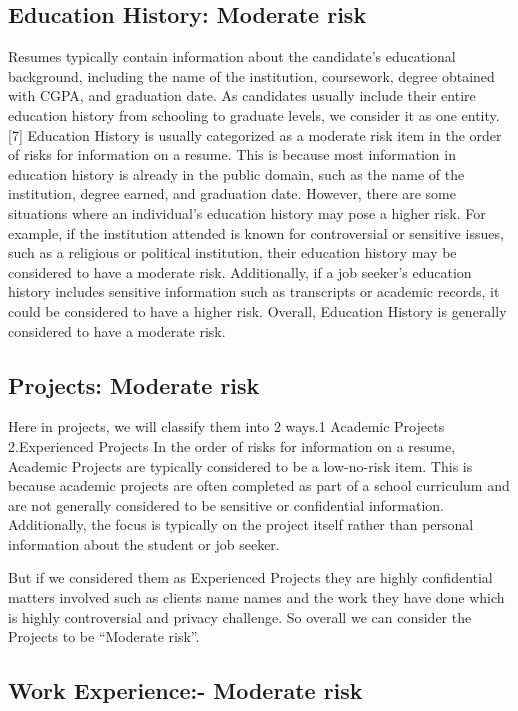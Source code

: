 \documentclass{article}
\begin{document}
\subsection{Education History: Moderate risk}
Resumes typically contain information about the candidate's educational background, including the name of the institution, coursework, degree obtained with CGPA, and graduation date. As candidates usually include their entire education history from schooling to graduate levels, we consider it as one entity.[7]
Education History is usually categorized as a moderate risk item in the order of risks for information on a resume. This is because most information in education history is already in the public domain, such as the name of the institution, degree earned, and graduation date. However, there are some situations where an individual's education history may pose a higher risk. For example, if the institution attended is known for controversial or sensitive issues, such as a religious or political institution, their education history may be considered to have a moderate risk. Additionally, if a job seeker's education history includes sensitive information such as transcripts or academic records, it could be considered to have a higher risk. Overall, Education History is generally considered to have a moderate risk.


\subsection{Projects: Moderate risk}

Here in projects, we will classify them into 2 ways.1 Academic Projects 2.Experienced Projects
In the order of risks for information on a resume, Academic Projects are typically considered to be a low-no-risk item. This is because academic projects are often completed as part of a school curriculum and are not generally considered to be sensitive or confidential information. Additionally, the focus is typically on the project itself rather than personal information about the student or job seeker. 

But if we considered them as Experienced Projects they are highly confidential matters involved such as clients name names and the work they have done which is highly controversial and privacy challenge. So overall we can consider the Projects to be “Moderate risk”.

\subsection{Work Experience:- Moderate risk}
\end{document}
